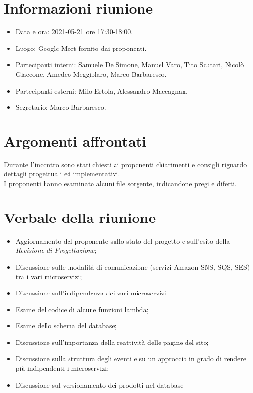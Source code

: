 \documentclass[a4paper]{article}
\begin{document}
\newpage
\tableofcontents
\newpage

\section{Informazioni riunione}
\begin{itemize}
    \item Data e ora: 2021-05-21 ore 17:30-18:00.
    \item Luogo: Google Meet fornito dai proponenti.
    \item Partecipanti interni: Samuele De Simone, Manuel Varo, Tito Scutari, Nicolò Giaccone, Amedeo Meggiolaro, Marco Barbaresco.
    \item Partecipanti esterni: Milo Ertola, Alessandro Maccagnan.
    \item Segretario: Marco Barbaresco.
\end{itemize}
\section{Argomenti affrontati}
Durante l'incontro sono stati chiesti ai proponenti chiarimenti e consigli riguardo dettagli progettuali ed implementativi.\\
I proponenti hanno esaminato alcuni file sorgente, indicandone pregi e difetti.
\section{Verbale della riunione}
\begin{itemize}
    \item Aggiornamento del proponente sullo stato del progetto e sull'esito della \textit{Revisione di Progettazione};
    \item Discussione sulle modalità di comunicazione (servizi Amazon SNS, SQS, SES) tra i vari microservizi;
    \item Discussione sull'indipendenza dei vari microservizi
    \item Esame del codice di alcune funzioni lambda;
    \item Esame dello schema del database;
    \item Discussione sull'importanza della reattività delle pagine del sito;
    \item Discussione sulla struttura degli eventi e su un approccio in grado di rendere più indipendenti i microservizi;
    \item Discussione sul versionamento dei prodotti nel database.
\end{itemize}
\end{document}
